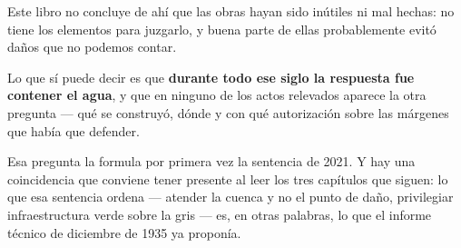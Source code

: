 Este libro no concluye de ahí que las obras hayan sido inútiles ni mal hechas: no tiene los
elementos para juzgarlo, y buena parte de ellas probablemente evitó daños que no podemos
contar.

Lo que sí puede decir es que \textbf{durante todo ese siglo la respuesta fue contener el
agua}, y que en ninguno de los actos relevados aparece la otra pregunta --- qué se construyó,
dónde y con qué autorización sobre las márgenes que había que defender.

Esa pregunta la formula por primera vez la sentencia de 2021. Y hay una coincidencia que
conviene tener presente al leer los tres capítulos que siguen: lo que esa sentencia ordena
--- atender la cuenca y no el punto de daño, privilegiar infraestructura verde sobre la gris
--- es, en otras palabras, lo que el informe técnico de diciembre de 1935 ya proponía.
